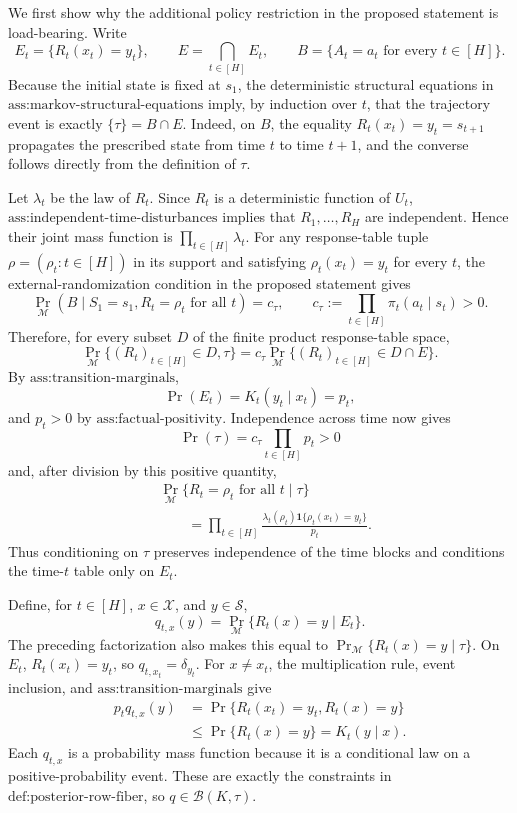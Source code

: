 We first show why the additional policy restriction in the proposed statement is load-bearing.  Write
\[
 E_t=\{R_t(x_t)=y_t\},\qquad E=\bigcap_{t\in[H]}E_t,
 \qquad B=\{A_t=a_t\text{ for every }t\in[H]\}.
\]
Because the initial state is fixed at \(s_1\), the deterministic structural equations in \(\text{ass:markov-structural-equations}\) imply, by induction over \(t\), that the trajectory event is exactly \(\{\tau\}=B\cap E\).  Indeed, on \(B\), the equality \(R_t(x_t)=y_t=s_{t+1}\) propagates the prescribed state from time \(t\) to time \(t+1\), and the converse follows directly from the definition of \(\tau\).

Let \(\lambda_t\) be the law of \(R_t\).  Since \(R_t\) is a deterministic function of \(U_t\), \(\text{ass:independent-time-disturbances}\) implies that \(R_1,\ldots,R_H\) are independent.  Hence their joint mass function is \(\prod_{t\in[H]}\lambda_t\).  For any response-table tuple \(\rho=(\rho_t:t\in[H])\) in its support and satisfying \(\rho_t(x_t)=y_t\) for every \(t\), the external-randomization condition in the proposed statement gives
\[
 \Pr_{\mathcal M}(B\mid S_1=s_1,R_t=\rho_t\text{ for all }t)
 =c_\tau,
 \qquad
 c_\tau:=\prod_{t\in[H]}\pi_t(a_t\mid s_t)>0.
\]
Therefore, for every subset \(D\) of the finite product response-table space,
\[
 \Pr_{\mathcal M}\{(R_t)_{t\in[H]}\in D,\tau\}
 =c_\tau\Pr_{\mathcal M}\{(R_t)_{t\in[H]}\in D\cap E\}.
\]
By \(\text{ass:transition-marginals}\),
\[
 \Pr(E_t)=K_t(y_t\mid x_t)=p_t,
\]
and \(p_t>0\) by \(\text{ass:factual-positivity}\).  Independence across time now gives
\[
 \Pr(\tau)=c_\tau\prod_{t\in[H]}p_t>0
\]
and, after division by this positive quantity,
\[
 \begin{aligned}
 &\Pr_{\mathcal M}\{R_t=\rho_t\text{ for all }t\mid\tau\}\\
 &\qquad=\prod_{t\in[H]}
 \frac{\lambda_t(\rho_t)\mathbf 1\{\rho_t(x_t)=y_t\}}{p_t}.
 \end{aligned}
\]
Thus conditioning on \(\tau\) preserves independence of the time blocks and conditions the time-\(t\) table only on \(E_t\).

Define, for \(t\in[H]\), \(x\in\mathcal X\), and \(y\in\mathcal S\),
\[
 q_{t,x}(y)=\Pr_{\mathcal M}\{R_t(x)=y\mid E_t\}.
\]
The preceding factorization also makes this equal to \(\Pr_{\mathcal M}\{R_t(x)=y\mid\tau\}\).  On \(E_t\), \(R_t(x_t)=y_t\), so \(q_{t,x_t}=\delta_{y_t}\).  For \(x\ne x_t\), the multiplication rule, event inclusion, and \(\text{ass:transition-marginals}\) give
\[
 \begin{aligned}
 p_tq_{t,x}(y)
 &=\Pr\{R_t(x_t)=y_t,R_t(x)=y\}\\
 &\le \Pr\{R_t(x)=y\}
 =K_t(y\mid x).
 \end{aligned}
\]
Each \(q_{t,x}\) is a probability mass function because it is a conditional law on a positive-probability event.  These are exactly the constraints in \(\text{def:posterior-row-fiber}\), so \(q\in\mathcal B(K,\tau)\).


